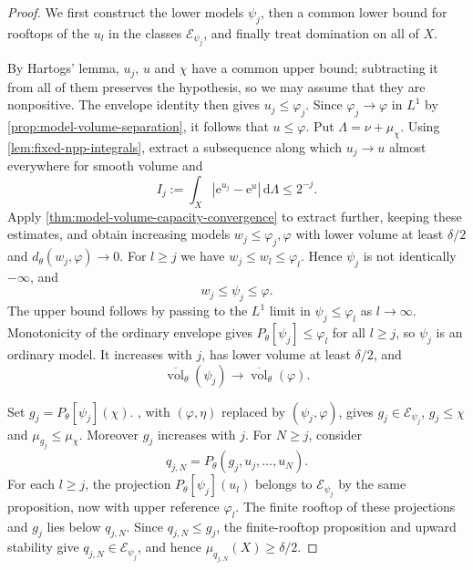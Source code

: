 \begin{proof}
We first construct the lower models $\psi_j$, then a common lower bound for rooftops of the $u_l$ in the classes $\mathcal E_{\psi_j}$, and finally treat domination on all of $X$.

By Hartogs' lemma, $u_j$, $u$ and $\chi$ have a common upper bound; subtracting it from all of them preserves the hypothesis, so we may assume that they are nonpositive. The envelope identity then gives $u_j\leq\varphi_j$. Since $\varphi_j\to\varphi$ in $L^1$ by \cref{prop:model-volume-separation}, it follows that $u\leq\varphi$. Put $\Lambda=\nu+\mu_\chi$. Using \cref{lem:fixed-npp-integrals}, extract a subsequence along which $u_j\to u$ almost everywhere for smooth volume and
\[
 I_j:=\int_X|\mathrm{e}^{u_j}-\mathrm{e}^u|\,\mathrm{d}\Lambda\leq2^{-j}.
\]
Apply \cref{thm:model-volume-capacity-convergence} to extract further, keeping these estimates, and obtain increasing models $w_j\leq\varphi_j,\varphi$ with lower volume at least $\delta/2$ and $d_\theta(w_j,\varphi)\to0$. For $l\geq j$ we have $w_j\leq w_l\leq\varphi_l$. Hence $\psi_j$ is not identically $-\infty$, and
\[
 w_j\leq\psi_j\leq\varphi.
\]
The upper bound follows by passing to the $L^1$ limit in $\psi_j\leq\varphi_l$ as $l\to\infty$. Monotonicity of the ordinary envelope gives $P_\theta[\psi_j]\leq\varphi_l$ for all $l\geq j$, so $\psi_j$ is an ordinary model. It increases with $j$, has lower volume at least $\delta/2$, and
\begin{equation}\label{eq:varying-reference-volume-limit}
 \overline{\operatorname{vol}}_\theta(\psi_j)
 \longrightarrow\overline{\operatorname{vol}}_\theta(\varphi).
\end{equation}

Set $g_j=P_\theta[\psi_j](\chi)$. , with $(\varphi,\eta)$ replaced by $(\psi_j,\varphi)$, gives $g_j\in\mathcal E_{\psi_j}$, $g_j\leq\chi$ and $\mu_{g_j}\leq\mu_\chi$. Moreover $g_j$ increases with $j$. For $N\geq j$, consider
\[
 q_{j,N}=P_\theta(g_j,u_j,\ldots,u_N).
\]
For each $l\geq j$, the projection $P_\theta[\psi_j](u_l)$ belongs to $\mathcal E_{\psi_j}$ by the same proposition, now with upper reference $\varphi_l$. The finite rooftop of these projections and $g_j$ lies below $q_{j,N}$. Since $q_{j,N}\leq g_j$, the finite-rooftop proposition and upward stability give $q_{j,N}\in\mathcal E_{\psi_j}$, and hence $\mu_{q_{j,N}}(X)\geq\delta/2$.


\end{proof}
